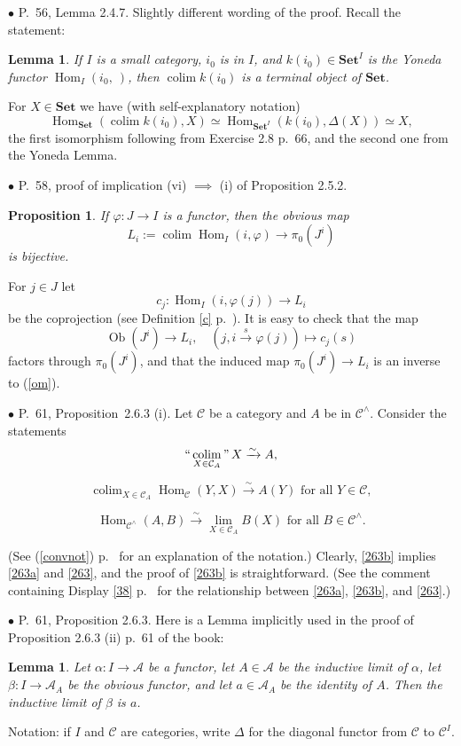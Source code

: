 \documentclass[12pt]{article}
\newtheorem{lem}[thm]{Lemma}
\newtheorem{prop}[thm]{Proposition}
\theoremstyle{remark}%
\newcommand{\bu}{\bullet}
\newcommand{\n}{\noindent}
\newcommand{\A}{\mathcal A}
\newcommand{\C}{\mathcal C}
\newcommand{\Set}{\textbf{Set}}
\newcommand{\p}{\varphi}
\newcommand{\pf}{\n{\em Proof. }}
\newcommand{\bl}{\begin{lem}}
\newcommand{\el}{\end{lem}}
\newcommand{\bp}{\begin{prop}}
\newcommand{\ep}{\end{prop}}
\newcommand{\pr}{Proposition}
\newcommand{\cn}{(See (\ref{convnot}) p.~\pageref{convnot} for an explanation of the notation.) }
\DeclareMathOperator*{\coli}{colim}
\DeclareMathOperator*{\co}{colim}
\DeclareMathOperator*{\ic}{``\coli"}
\DeclareMathOperator{\Hom}{Hom}
\DeclareMathOperator{\h}{Hom}
\DeclareMathOperator{\Ob}{Ob}
\begin{document}

\n$\bu$ P.~56, Lemma 2.4.7. Slightly different wording of the proof. Recall the statement: 
%
\bl 
If $I$ is a small category, $i_0$ is in $I$, and $k(i_0)\in\Set^I$ is the Yoneda functor $\Hom_I(i_0,\ )$, then $\coli k(i_0)$ is a terminal object of $\Set$. 
\el
% 
\pf For $X\in\Set$ we have (with self-explanatory notation)
$$
\Hom_{\Set}\left(\coli k(i_0),X\right)\simeq\Hom_{{\Set}^I}(k(i_0),\Delta(X))\simeq X,
$$
the first isomorphism following from Exercise 2.8 p.~66, and the second one from the Yoneda Lemma. 


\n$\bu$ P.~58, proof of implication (vi) $\implies$ (i) of Proposition 2.5.2. 
%
\bp 
If $\p:J\to I$ is a functor, then the obvious map  
\begin{equation}\label{om}
L_i:=\coli\Hom_I(i,\p)\to\pi_0(J^i)
\end{equation}
is bijective. 
\ep
%  
\pf For $j\in J$ let 
$$
c_j:\Hom_I(i,\p(j))\to L_i
$$
be the coprojection (see Definition \ref{c} p.~\pageref{c}). It is easy to check that the map 
$$
\Ob(J^i)\to L_i,\quad (j,i\overset{s}{\to}\p(j))\mapsto c_j(s)
$$
factors through $\pi_0(J^i)$, and that the induced map $\pi_0(J^i)\to L_i$ is an inverse to (\ref{om}). 


\n$\bu$ P.~61, \pr\ 2.6.3 (i). Let $\C$ be a category and $A$ be in $\C^\wedge$. Consider the statements  
% 
\begin{equation}\label{263a}
\ic_{X\in\C_A}X\xrightarrow\sim A, 
\end{equation} 

\begin{equation}\label{263b}
\co_{X\in\C_A}\h_\C(Y,X)\xrightarrow\sim A(Y)\text{ for all }Y\in\C, 
\end{equation}

\begin{equation}\label{263} 
\h_{\C^\wedge}(A,B)\xrightarrow\sim\lim_{X\in\C_A}B(X)\text{ for all }B\in\C^\wedge. 
\end{equation} 

\n\cn Clearly, \eqref{263b} implies \eqref{263a} and \eqref{263}, and the proof of \eqref{263b} is straightforward. (See the comment containing Display \eqref{38} p.~\pageref{38} for the relationship between \eqref{263a}, \eqref{263b}, and \eqref{263}.) 


\n$\bu$ P.~61, Proposition 2.6.3. Here is a Lemma implicitly used in the proof of Proposition 2.6.3 (ii) p.~61 of the book: 
% 
\begin{lem} 
Let $\alpha:I\to\A$ be a functor, let $A\in\A$ be the inductive limit of $\alpha$, let $\beta:I\to\A_A$ be the obvious functor, and let $a\in\A_A$ be the identity of $A$. Then the inductive limit of $\beta$ is $a$. 
\end{lem} 
%
\n{\em Proof.} Notation: if $I$ and $\C$ are categories, write $\Delta$ for the diagonal functor from $\C$ to $\C^I$. 
\end{document}
